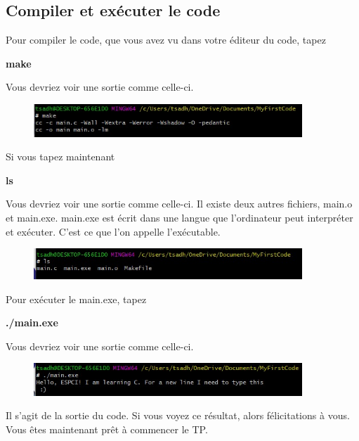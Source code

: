 \documentclass{article}
\begin{document}
\subsection{Compiler et exécuter le code}
Pour compiler le code, que vous avez vu dans votre éditeur du code, tapez
\begin{tcolorbox}[width=\textwidth,colframe=MidnightBlue,colback={black},title={Ceci est la console MinGW-w64 Win64 Shell},outer arc=0mm,colupper=white]    
      \large\textbf{make}
\end{tcolorbox}
Vous devriez voir une sortie comme celle-ci.
\begin{figure}[H]
\center
\includegraphics[width=0.9\textwidth]{Plots/FirstCode_6.jpeg}
\end{figure}
Si vous tapez maintenant 
\begin{tcolorbox}[width=\textwidth,colframe=MidnightBlue,colback={black},title={Ceci est la console MinGW-w64 Win64 Shell},outer arc=0mm,colupper=white]    
      \large\textbf{ls}
\end{tcolorbox}
Vous devriez voir une sortie comme celle-ci. Il existe deux autres fichiers, main.o et main.exe. main.exe est écrit dans une langue que l'ordinateur peut interpréter et exécuter. C'est ce que l'on appelle l'exécutable.
 \begin{figure}[H]
\center
\includegraphics[width=0.9\textwidth]{Plots/FirstCode_7.jpeg}
\end{figure}
Pour exécuter le main.exe, tapez
\begin{tcolorbox}[width=\textwidth,colframe=MidnightBlue,colback={black},title={Ceci est la console MinGW-w64 Win64 Shell},outer arc=0mm,colupper=white]    
      \large\textbf{./main.exe}
\end{tcolorbox}
Vous devriez voir une sortie comme celle-ci. 
\begin{figure}[H]
\center
\includegraphics[width=0.9\textwidth]{Plots/FirstCode_8.jpeg}
\end{figure}
Il s'agit de la sortie du code. Si vous voyez ce résultat, alors félicitations à vous. Vous êtes maintenant prêt à commencer le TP.
\end{document}
